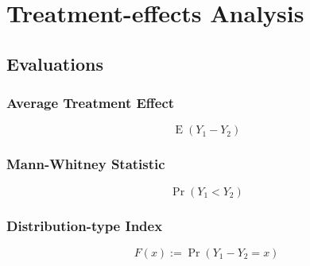 \chapter{Treatment-effects Analysis}

\section{Evaluations}

\subsection{Average Treatment Effect}

\begin{definition}
	\begin{equation}
		\operatorname{E}\left(Y_{1}-Y_{2}\right)
	\end{equation}
\end{definition}

\subsection{Mann-Whitney Statistic}

\begin{definition}
	\begin{equation}
		\operatorname{Pr}\left(Y_{1}<Y_{2}\right)
	\end{equation}
\end{definition}

\subsection{Distribution-type Index}

\begin{definition}
	\begin{equation}
		F(x):=\operatorname{Pr}\left(Y_{1}-Y_{2}=x\right)
	\end{equation}
\end{definition}
